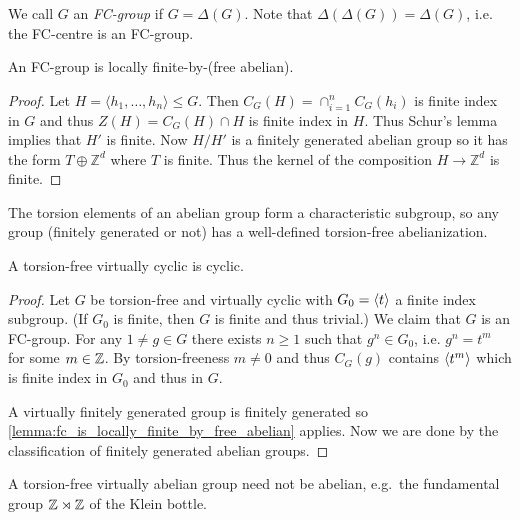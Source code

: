 We call $G$ an \emph{FC-group} if $G = \Delta(G)$.
Note that $\Delta(\Delta(G)) = \Delta(G)$, i.e. the FC-centre is an FC-group.

\begin{lemma}
    \label{lemma:fc_is_locally_finite_by_free_abelian}
    An FC-group is locally finite-by-(free abelian).
\end{lemma}

\begin{proof}
    Let $H = \langle h_1, \dots, h_n \rangle \leq G$.
    Then $C_G(H) = \cap_{i=1}^n C_G(h_i)$ is finite index in $G$ and thus $Z(H) = C_G(H) \cap H$ is finite index in $H$.
    Thus Schur's lemma implies that $H'$ is finite.
    Now $H / H'$ is a finitely generated abelian group so it has the form $T \oplus \mathbb{Z}^d$ where $T$ is finite.
    Thus the kernel of the composition $H \to \mathbb{Z}^d$ is finite.
\end{proof}

\begin{remark}
    The torsion elements of an abelian group form a characteristic subgroup, so any group (finitely generated or not) has a well-defined torsion-free abelianization.
\end{remark}

\begin{corollary}
    A torsion-free virtually cyclic is cyclic.
\end{corollary}

\begin{proof}
    Let $G$ be torsion-free and virtually cyclic with $G_0 = \langle t \rangle$ a finite index subgroup.
    (If $G_0$ is finite, then $G$ is finite and thus trivial.)
    We claim that $G$ is an FC-group.
    For any $1 \neq g \in G$ there exists $n \geq 1$ such that $g^n \in G_0$, i.e. $g^n = t^m$ for some $m \in \mathbb{Z}$.
    By torsion-freeness $m \neq 0$ and thus $C_G(g)$ contains $\langle t^m \rangle$ which is finite index in $G_0$ and thus in $G$.

    A virtually finitely generated group is finitely generated so \cref{lemma:fc_is_locally_finite_by_free_abelian} applies.
    Now we are done by the classification of finitely generated abelian groups.
\end{proof}

\begin{remark}
    A torsion-free virtually abelian group need not be abelian, e.g.\ the fundamental group $\mathbb{Z} \rtimes \mathbb{Z}$ of the Klein bottle.
\end{remark}

